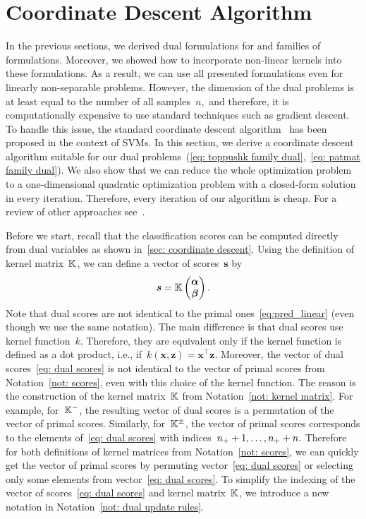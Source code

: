 \section{Coordinate Descent Algorithm}\label{sec: coordinate descent}

In the previous sections, we derived dual formulations for \TopPushK and \PatMat families of formulations. Moreover, we showed how to incorporate non-linear kernels into these formulations. As a result, we can use all presented formulations even for linearly non-separable problems. However, the dimension of the dual problems is at least equal to the number of all samples~$n,$ and therefore, it is computationally expensive to use standard techniques such as gradient descent. To handle this issue, the standard coordinate descent algorithm~\cite{chang2008coordinate, hsieh2008dual} has been proposed in the context of SVMs. In this section, we derive a coordinate descent algorithm suitable for our dual problems~(\ref{eq: toppushk family dual},~\ref{eq: patmat family dual}). We also show that we can reduce the whole optimization problem to a one-dimensional quadratic optimization problem with a closed-form solution in every iteration. Therefore, every iteration of our algorithm is cheap. For a review of other approaches see~\cite{batmaz2019review,werner2019review}.

Before we start, recall that the classification scores can be computed directly from dual variables as shown in~\eqref{sec: coordinate descent}. Using the definition of kernel matrix~$\mathbb{K}$, we can define a vector of scores~$\bm{s}$ by
\begin{equation}\label{eq: dual scores}
  \bm{s} = \mathbb{K} \begin{pmatrix} \bm{\alpha} \\ \bm{\beta} \end{pmatrix}.
\end{equation}
Note that dual scores are not identical to the primal ones~\eqref{eq:pred_linear} (even though we use the same notation). The main difference is that dual scores use kernel function~$k.$ Therefore, they are equivalent only if the kernel function is defined as a dot product, i.e., if~$k(\bm{x}, \bm{z}) = \bm{x}^{\top} \bm{z}.$ Moreover, the vector of dual scores~\eqref{eq: dual scores} is not identical to the vector of primal scores from Notation~\ref{not: scores}, even with this choice of the kernel function. The reason is the construction of the kernel matrix~$\mathbb{K}$ from Notation~\ref{not: kernel matrix}. For example, for~$\mathbb{K}^{-}$, the resulting vector of dual scores is a permutation of the vector of primal scores. Similarly, for~$\mathbb{K}^{\pm}$, the vector of primal scores corresponds to the elements of~\eqref{eq: dual scores} with indices~$n_{+} + 1, \ldots, n_{+} + n.$ Therefore for both definitions of kernel matrices from Notation~\ref{not: scores}, we can quickly get the vector of primal scores by permuting vector~\eqref{eq: dual scores} or selecting only some elements from vector~\eqref{eq: dual scores}. To simplify the indexing of the vector of scores~\eqref{eq: dual scores} and kernel matrix~$\mathbb{K}$, we introduce a new notation in Notation~\ref{not: dual update rules}.

